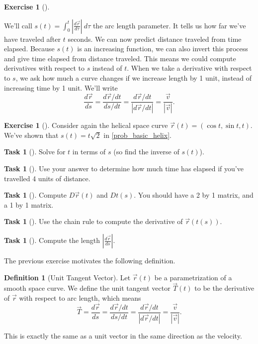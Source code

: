 \documentclass[10pt,]{book}
\theoremstyle{plain}
\theoremstyle{definition}
\newtheorem{definition}[theorem]{Definition}
\theoremstyle{definition}
\theoremstyle{definition}
\theoremstyle{definition}
\newtheorem{exploration}[project]{Exercise}
\newtheorem{task}[project]{Task}
\theoremstyle{definition}
\numberwithin{equation}{section}
\newcommand{\ds}{\displaystyle}
\begin{document}
\begin{exploration}[]\label{fundamental_theorem_of_calculus_as_it_applies_to_arc_length_parameter}
\end{exploration}
We'll call \(\ds s(t)=\int_0^t \left|\frac {d\vec r}{d\tau}\right|\ d\tau\) the arc length parameter. It tells us how far we've have traveled after \(t\) seconds. We can now predict distance traveled from time elapsed. Because \(s(t)\) is an increasing function, we can also invert this process and give time elapsed from distance traveled. This means we could compute derivatives with respect to \(s\) instead of \(t\). When we take a derivative with respect to \(s\), we ask how much a curve changes if we increase length by 1 unit, instead of increasing time by 1 unit. We'll write%
\begin{equation*}
\ds\frac{d\vec r}{ds} =\ds\frac{d\vec r/dt}{ds/dt} = \frac{d\vec r/dt}{|d\vec r/dt|} = \frac{\vec v}{|\vec{v}|}.
\end{equation*}
%
\begin{exploration}[]\label{exploration-168}
Consider again the helical space curve \(\vec r(t)=(\cos t, \sin t, t)\). We've shown that \(s(t) = t\sqrt{2}\) in \hyperref[prob_basic_helix]{\ref{prob_basic_helix}}.%
\begin{task}[]\label{task-393}
Solve for \(t\) in terms of \(s\) (so find the inverse of \(s(t)\)).%
\end{task}
\begin{task}[]\label{task-394}
Use your answer to determine how much time has elapsed if you've travelled 4 units of distance.%
\end{task}
\begin{task}[]\label{task-395}
Compute \(D\vec r(t)\) and \(Dt(s)\).  You should have a 2 by 1 matrix, and a 1 by 1 matrix.%
\end{task}
\begin{task}[]\label{task-396}
Use the chain rule to compute the derivative of \(\vec r(t(s))\).%
\end{task}
\begin{task}[]\label{task-397}
Compute the length \(\left|\ds\frac{d\vec r}{ds}\right|\).%
\end{task}
\end{exploration}
The previous exercise motivates the following definition.%
\begin{definition}[{Unit Tangent Vector}]\label{def_unit_tangent_vector}
Let \(\vec r(t)\) be a parametrization of a smooth space curve. We define the unit tangent vector \(\vec T(t)\) to be the derivative of \(\vec r\) with respect to arc length, which means%
\begin{equation*}
\vec T = \ds\frac{d\vec r}{ds}=\ds\frac{d\vec r/dt}{ds/dt} = \frac{d\vec r/dt}{|d \vec r/dt|} = \frac{\vec v}{|\vec v|}.
\end{equation*}
%
\par
This is exactly the same as a unit vector in the same direction as the velocity.%
\end{definition}
\end{document}

